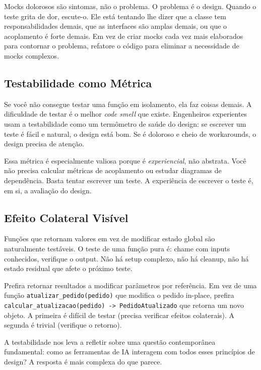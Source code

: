 Mocks dolorosos são sintomas, não o problema. O problema é o design.
Quando o teste grita de dor, escute-o. Ele está tentando lhe dizer que
a classe tem responsabilidades demais, que as interfaces são amplas demais,
ou que o acoplamento é forte demais. Em vez de criar mocks cada vez mais
elaborados para contornar o problema, refatore o código para eliminar a
necessidade de mocks complexos.

\subsection{Testabilidade como Métrica}

Se você não consegue testar uma função em isolamento, ela faz coisas demais. A
dificuldade de testar é o melhor \emph{code smell} que existe. Engenheiros
experientes usam a testabilidade como um termômetro de saúde do design: se
escrever um teste é fácil e natural, o design está bom. Se é doloroso e
cheio de workarounds, o design precisa de atenção.

Essa métrica é especialmente valiosa porque é \emph{experiencial}, não
abstrata. Você não precisa calcular métricas de acoplamento ou estudar
diagramas de dependência. Basta tentar escrever um teste. A experiência de
escrever o teste é, em si, a avaliação do design.

\subsection{Efeito Colateral Visível}

Funções que retornam valores em vez de modificar estado global são naturalmente
testáveis. O teste de uma função pura é: chame com inputs conhecidos, verifique
o output. Não há setup complexo, não há cleanup, não há estado residual que
afete o próximo teste.

Prefira retornar resultados a modificar parâmetros por referência. Em vez de
uma função \texttt{atualizar\_pedido(pedido)} que modifica o pedido in-place,
prefira \texttt{calcular\_atualizacao(pedido) -> PedidoAtualizado} que retorna
um novo objeto. A primeira é difícil de testar (precisa verificar efeitos
colaterais). A segunda é trivial (verifique o retorno).

A testabilidade nos leva a refletir sobre uma questão contemporânea
fundamental: como as ferramentas de IA interagem com todos esses princípios
de design? A resposta é mais complexa do que parece.


